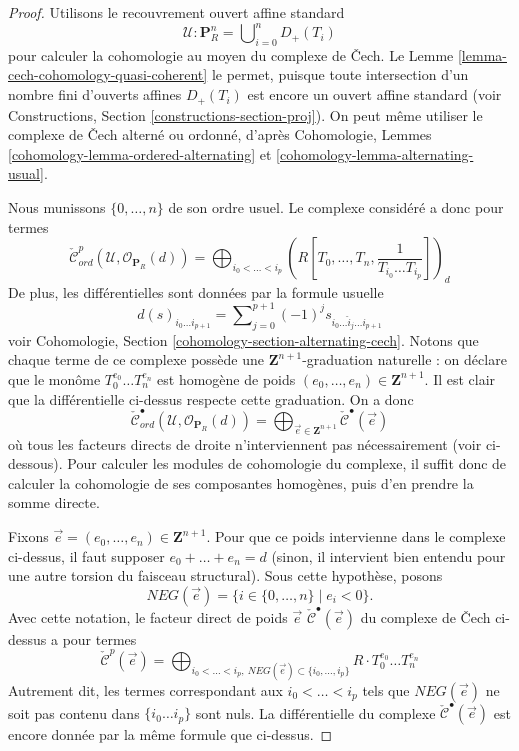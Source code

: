 \begin{proof}
Utilisons le recouvrement ouvert affine standard
$$
\mathcal{U} : \mathbf{P}^n_R = \bigcup\nolimits_{i = 0}^n D_{+}(T_i)
$$
pour calculer la cohomologie au moyen du complexe de {\v C}ech.
Le Lemme \ref{lemma-cech-cohomology-quasi-coherent} le permet,
puisque toute intersection d'un nombre fini d'ouverts affines $D_{+}(T_i)$ est encore un
ouvert affine standard (voir
Constructions, Section \ref{constructions-section-proj}).
On peut même utiliser le complexe de {\v C}ech alterné ou ordonné, d'après
Cohomologie, Lemmes \ref{cohomology-lemma-ordered-alternating} et
\ref{cohomology-lemma-alternating-usual}.

\medskip\noindent
Nous munissons $\{0, \ldots, n\}$ de son ordre usuel.
Le complexe considéré a donc pour termes
$$
\check{\mathcal{C}}_{ord}^p(\mathcal{U}, \mathcal{O}_{\mathbf{P}_R}(d))
=
\bigoplus\nolimits_{i_0 < \ldots < i_p}
(R[T_0, \ldots, T_n, \frac{1}{T_{i_0} \ldots T_{i_p}}])_d
$$
De plus, les différentielles sont données par la formule usuelle
$$
d(s)_{i_0 \ldots i_{p + 1}} =
\sum\nolimits_{j = 0}^{p + 1} (-1)^j s_{i_0 \ldots \hat i_j \ldots i_{p + 1}}
$$
voir Cohomologie, Section \ref{cohomology-section-alternating-cech}.
Notons que chaque terme de ce complexe possède une
$\mathbf{Z}^{n + 1}$-graduation naturelle : on déclare que le monôme
$T_0^{e_0} \ldots T_n^{e_n}$ est homogène de poids
$(e_0, \ldots, e_n) \in \mathbf{Z}^{n + 1}$. Il est clair que la différentielle
ci-dessus respecte cette graduation. On a donc
$$
\check{\mathcal{C}}_{ord}^\bullet(\mathcal{U}, \mathcal{O}_{\mathbf{P}_R}(d))
=
\bigoplus\nolimits_{\vec{e} \in \mathbf{Z}^{n + 1}}
\check{\mathcal{C}}^\bullet(\vec{e})
$$
où tous les facteurs directs de droite n'interviennent pas nécessairement (voir ci-dessous).
Pour calculer les modules de cohomologie
du complexe, il suffit donc de calculer la cohomologie de ses composantes
homogènes, puis d'en prendre la somme directe.

\medskip\noindent
Fixons $\vec{e} = (e_0, \ldots, e_n) \in \mathbf{Z}^{n + 1}$. Pour que ce
poids intervienne dans le complexe ci-dessus, il faut supposer
$e_0 + \ldots + e_n = d$ (sinon, il intervient bien entendu pour une autre torsion du
faisceau structural). Sous cette hypothèse, posons
$$
NEG(\vec{e}) = \{i \in \{0, \ldots, n\} \mid e_i < 0\}.
$$
Avec cette notation, le facteur direct de poids $\vec{e}$
$\check{\mathcal{C}}^\bullet(\vec{e})$ du complexe de {\v C}ech ci-dessus
a pour termes
$$
\check{\mathcal{C}}^p(\vec{e})
=
\bigoplus\nolimits_{i_0 < \ldots < i_p,
\ NEG(\vec{e}) \subset \{i_0, \ldots, i_p\}}
R \cdot T_0^{e_0} \ldots T_n^{e_n}
$$
Autrement dit, les termes correspondant aux $i_0 < \ldots < i_p$ tels
que $NEG(\vec{e})$ ne soit pas contenu dans $\{i_0 \ldots i_p\}$ sont nuls.
La différentielle du complexe $\check{\mathcal{C}}^\bullet(\vec{e})$
est encore donnée par la même formule que ci-dessus.


\end{proof}
